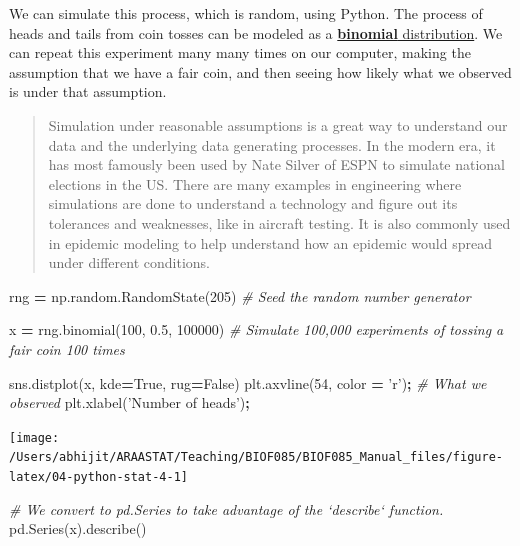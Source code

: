 \documentclass[
  letterpaper,
]{scrbook}
\newenvironment{Shaded}{\begin{snugshade}}{\end{snugshade}}
\newcommand{\CommentTok}[1]{\textcolor[rgb]{0.56,0.35,0.01}{\textit{#1}}}
\newcommand{\DecValTok}[1]{\textcolor[rgb]{0.00,0.00,0.81}{#1}}
\newcommand{\FloatTok}[1]{\textcolor[rgb]{0.00,0.00,0.81}{#1}}
\newcommand{\NormalTok}[1]{#1}
\newcommand{\OperatorTok}[1]{\textcolor[rgb]{0.81,0.36,0.00}{\textbf{#1}}}
\newcommand{\StringTok}[1]{\textcolor[rgb]{0.31,0.60,0.02}{#1}}
\newcommand{\VariableTok}[1]{\textcolor[rgb]{0.00,0.00,0.00}{#1}}
\begin{document}
We can simulate this process, which is random, using Python. The process of heads and tails from coin tosses can be modeled as a \href{https://en.wikipedia.org/wiki/Binomial_distribution}{\textbf{binomial} distribution}. We can repeat this experiment many many times on our computer, making the assumption that we have a fair coin, and then seeing how likely what we observed is under that assumption.

\begin{quote}
Simulation under reasonable assumptions is a great way to understand our data and the underlying data generating processes. In the modern era, it has most famously been used by Nate Silver of ESPN to simulate national elections in the US. There are many examples in engineering where simulations are done to understand a technology and figure out its tolerances and weaknesses, like in aircraft testing. It is also commonly used in epidemic modeling to help understand how an epidemic would spread under different conditions.
\end{quote}

\begin{Shaded}
\begin{Highlighting}[]
\NormalTok{rng }\OperatorTok{=}\NormalTok{ np.random.RandomState(}\DecValTok{205}\NormalTok{) }\CommentTok{# Seed the random number generator}

\NormalTok{x }\OperatorTok{=}\NormalTok{ rng.binomial(}\DecValTok{100}\NormalTok{, }\FloatTok{0.5}\NormalTok{, }\DecValTok{100000}\NormalTok{) }\CommentTok{# Simulate 100,000 experiments of tossing a fair coin 100 times}

\NormalTok{sns.distplot(x, kde}\OperatorTok{=}\VariableTok{True}\NormalTok{, rug}\OperatorTok{=}\VariableTok{False}\NormalTok{)}
\NormalTok{plt.axvline(}\DecValTok{54}\NormalTok{, color }\OperatorTok{=} \StringTok{'r'}\NormalTok{)}\OperatorTok{;} \CommentTok{# What we observed}
\NormalTok{plt.xlabel(}\StringTok{'Number of heads'}\NormalTok{)}\OperatorTok{;}
\end{Highlighting}
\end{Shaded}

\begin{center}\texttt{[image: /Users/abhijit/ARAASTAT/Teaching/BIOF085/BIOF085\_Manual\_files/figure-latex/04-python-stat-4-1]} \end{center}

\begin{Shaded}
\begin{Highlighting}[]
\CommentTok{# We convert to pd.Series to take advantage of the `describe` function.}
\NormalTok{pd.Series(x).describe() }
\end{Highlighting}
\end{Shaded}
\end{document}
